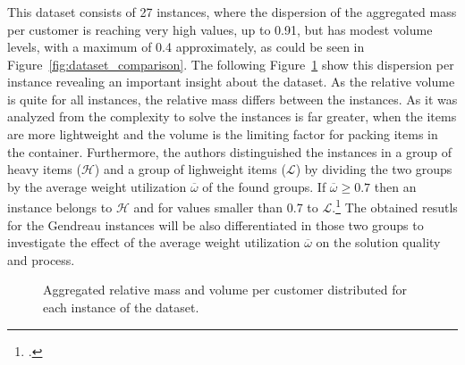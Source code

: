\subsubsection{\gendreauDataSetText}

This dataset consists of 27 instances, where the dispersion of the aggregated mass per customer is reaching very high values, up to
0.91, but has modest volume levels, with a maximum of 0.4 approximately, as could be seen in Figure~\ref{fig:dataset_comparison}. The
following Figure~\ref{fig:aggregated_gendreau_plots} show this dispersion per instance revealing an important insight about the dataset.
As the relative volume is quite for all instances, the relative mass differs between the instances. As it was analyzed from \cite{tamke_branch-and-cut_2024}
the complexity to solve the instances is far greater, when the items are more lightweight and the volume is the limiting factor
for packing items in the container. Furthermore, the authors distinguished the instances in a group of heavy items ($\mathcal{H}$) and
a group of lighweight items ($\mathcal{L}$) by dividing the two groups by the average weight utilization $\overline{\omega}$ of the found
groups. If $\overline{\omega} \geq 0.7$ then an instance belongs to $\mathcal{H}$ and for values smaller than 0.7 to $\mathcal{L}$.\footcite[cf.][pp. 23-25]{tamke_branch-and-cut_2024}
The obtained resutls for the Gendreau instances will be also differentiated in those two groups to investigate the effect of
the average weight utilization $\overline{\omega}$ on the solution quality and process.

\begin{figure}[ht]
    \centering
    \caption{Aggregated relative mass and volume per customer distributed for each instance of the \gendreauDataSetText dataset.}
    \label{fig:aggregated_gendreau_plots}
\end{figure}

